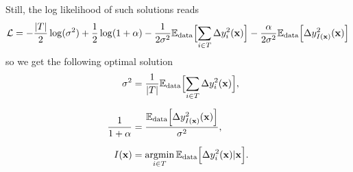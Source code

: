 Still, the log likelihood of such solutions reads
\[
{\cal L} = -\frac{\vert  T\vert}{2}\log(\sigma^2)+\frac{1}{2}\log(1+\alpha)-\frac{1}{2\sigma^2}{\mathbb E}_{\rm data}\Bigl[\sum_{i\in  T}\Delta y_i^2(\mathbf{x})\Bigr]-\frac{\alpha}{2\sigma^2}{\mathbb E}_{\rm data}\Bigl[\Delta y_{I(\mathbf{x})}^2(\mathbf{x})\Bigr]
\]
so we get the following optimal solution
\begin{align*}
\sigma^2 &= \frac{1}{\vert  T\vert}{\mathbb E}_{\rm data}\Bigl[\sum_{i\in  T}\Delta y_i^2(\mathbf{x})\Bigr],\\[0.2cm]
\frac{1}{1+\alpha} &=  \frac{{\mathbb E}_{\rm data}\Bigl[\Delta y_{I(\mathbf{x})}^2(\mathbf{x})\Bigr]}{\sigma^2},\\[0.2cm]
I(\mathbf{x}) &= \operatorname*{argmin}_{i\in  T} {\mathbb E}_{\rm data}\Bigl[\Delta y_i^2(\mathbf{x})\vert \mathbf{x} \Bigr].
\end{align*}